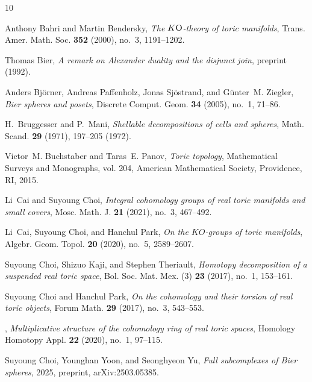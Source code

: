 \documentclass{amsart}
\theoremstyle{plain}
\numberwithin{equation}{section}
\theoremstyle{definition}
\theoremstyle{remark}
\begin{document}
\begin{thebibliography}{10}

Anthony Bahri and Martin Bendersky, \emph{The {$K{\rm O}$}-theory of toric
  manifolds}, Trans. Amer. Math. Soc. \textbf{352} (2000), no.~3, 1191--1202.

Thomas Bier, \emph{A remark on {A}lexander duality and the disjunct join},
  preprint (1992).

Anders Bj\"orner, Andreas Paffenholz, Jonas Sj\"ostrand, and G\"unter~M.
  Ziegler, \emph{Bier spheres and posets}, Discrete Comput. Geom. \textbf{34}
  (2005), no.~1, 71--86. 

H.~Bruggesser and P.~Mani, \emph{Shellable decompositions of cells and
  spheres}, Math. Scand. \textbf{29} (1971), 197--205 (1972). 

Victor~M. Buchstaber and Taras~E. Panov, \emph{Toric topology}, Mathematical
  Surveys and Monographs, vol. 204, American Mathematical Society, Providence,
  RI, 2015. 

Li~Cai and Suyoung Choi, \emph{Integral cohomology groups of real toric
  manifolds and small covers}, Mosc. Math. J. \textbf{21} (2021), no.~3,
  467--492. 

Li~Cai, Suyoung Choi, and Hanchul Park, \emph{On the {$KO$}-groups of toric
  manifolds}, Algebr. Geom. Topol. \textbf{20} (2020), no.~5, 2589--2607.

Suyoung Choi, Shizuo Kaji, and Stephen Theriault, \emph{Homotopy decomposition
  of a suspended real toric space}, Bol. Soc. Mat. Mex. (3) \textbf{23} (2017),
  no.~1, 153--161. 

Suyoung Choi and Hanchul Park, \emph{On the cohomology and their torsion of
  real toric objects}, Forum Math. \textbf{29} (2017), no.~3, 543--553.

\bysame, \emph{Multiplicative structure of the cohomology ring of real toric
  spaces}, Homology Homotopy Appl. \textbf{22} (2020), no.~1, 97--115.

Suyoung Choi, Younghan Yoon, and Seonghyeon Yu, \emph{Full subcomplexes of
  {B}ier spheres}, 2025, preprint, arXiv:2503.05385.


\end{thebibliography}
\end{document}
